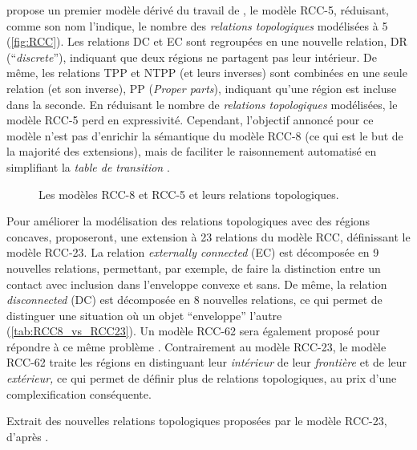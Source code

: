 \textcite{Bennett1994} propose un premier modèle dérivé du travail de
\textcite{Randell1992}, le modèle RCC-5, réduisant, comme son nom
l'indique, le nombre des \emph{relations topologiques} modélisées à 5
(\autoref{fig:RCC}). Les relations DC et EC sont regroupées en une
nouvelle relation, DR (\enquote{\emph{discrete}}), indiquant que deux
régions ne partagent pas leur intérieur. De même, les relations TPP et
NTPP (et leurs inverses) sont combinées en une seule relation (et son
inverse), PP (\emph{Proper parts}), indiquant qu'une région est
incluse dans la seconde. En réduisant le nombre de \emph{relations
  topologiques} modélisées, le modèle RCC-5 perd en expressivité.
Cependant, l'objectif annoncé pour ce modèle n'est pas d’enrichir la
sémantique du modèle RCC-8 (ce qui est le but de la majorité des
extensions), mais de faciliter le raisonnement automatisé en
simplifiant la \emph{table de transition} \autocite{Bennett1994}.

\begin{figure}[hb]
  \centering
  
  \caption[Les modèles RCC-8 et RCC-5 et leurs relations
  topologiques]{Les modèles RCC-8 et RCC-5 et leurs relations
    topologiques.}
  \label{fig:RCC}
\end{figure}

Pour améliorer la modélisation des relations topologiques avec des
régions concaves, \textcite{Cohn1997} proposeront, une extension à 23
relations du modèle RCC, définissant le modèle RCC-23. La relation
\emph{externally connected} (EC) est décomposée en 9 nouvelles
relations, permettant, par exemple, de faire la distinction entre un
contact avec inclusion dans l'enveloppe convexe et sans. De même, la
relation \emph{disconnected} (DC) est décomposée en 8 nouvelles
relations, ce qui permet de distinguer une situation où un objet
\enquote{enveloppe} l'autre (\autoref{tab:RCC8_vs_RCC23}). Un modèle
RCC-62 sera également proposé pour répondre à ce même problème
\autocite{Yang2007}. Contrairement au modèle RCC-23, le modèle RCC-62
traite les régions en distinguant leur \emph{intérieur} de leur
\emph{frontière} et de leur \emph{extérieur,} ce qui permet de définir
plus de relations topologiques, au prix d'une complexification
conséquente.

\begin{table}
  \centering
  
  \caption{Extrait des nouvelles relations topologiques proposées par
    le modèle RCC-23, d'après \textcite{Cohn1997}.}
  \label{tab:RCC8_vs_RCC23}
\end{table}

